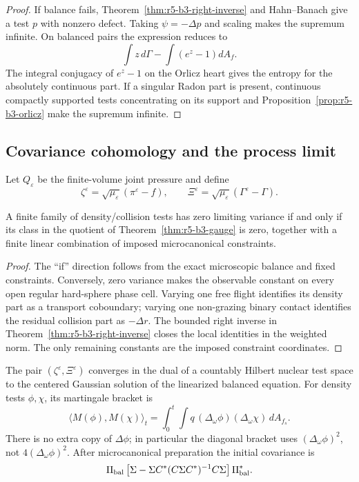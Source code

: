 \begin{proof}
If balance fails, Theorem~\ref{thm:r5-b3-right-inverse} and Hahn--Banach give
a test \(p\) with nonzero defect.  Taking \(\psi=-\Delta p\) and scaling
makes the supremum infinite.  On balanced pairs the expression reduces to
\[
 \int z\,d\Gamma-\int(e^z-1)dA_f.
\]
The integral conjugacy of \(e^z-1\) on the Orlicz heart gives the entropy for
the absolutely continuous part.  If a singular Radon part is present,
continuous compactly supported tests concentrating on its support and
Proposition~\ref{prop:r5-b3-orlicz} make the supremum infinite.
\end{proof}

\subsection{Covariance cohomology and the process limit}

Let \(Q_\varepsilon\) be the finite-volume joint pressure and define
\[
 \zeta^\varepsilon
 =\sqrt{\mu_\varepsilon}(\pi^\varepsilon-f),\qquad
 \Xi^\varepsilon
 =\sqrt{\mu_\varepsilon}(\Gamma^\varepsilon-\Gamma).
\]

\begin{lemma}
\label{lem:r5-b3-null}
A finite family of density/collision tests has zero limiting variance if and
only if its class in the quotient of
Theorem~\ref{thm:r5-b3-gauge} is zero, together with a finite linear
combination of imposed microcanonical constraints.
\end{lemma}

\begin{proof}
The ``if'' direction follows from the exact microscopic balance and fixed
constraints.  Conversely, zero variance makes the observable constant on
every open regular hard-sphere phase cell.  Varying one free flight identifies
its density part as a transport coboundary; varying one non-grazing binary
contact identifies the residual collision part as \(-\Delta r\).  The bounded
right inverse in Theorem~\ref{thm:r5-b3-right-inverse} closes the local
identities in the weighted norm.  The only remaining constants are the
imposed constraint coordinates.
\end{proof}

\begin{theorem}
\label{thm:r5-b3-gaussian}
The pair \((\zeta^\varepsilon,\Xi^\varepsilon)\) converges in the dual of a
countably Hilbert nuclear test space to the centered Gaussian solution of the
linearized balanced equation.  For density tests \(\phi,\chi\), its martingale
bracket is
\[
 \langle M(\phi),M(\chi)\rangle_t
 =
 \int_0^t\!\int
 q\,(\Delta_\omega\phi)(\Delta_\omega\chi)\,dA_{f_s}.
\]
There is no extra copy of \(\Delta\phi\); in particular the diagonal bracket
uses \((\Delta_\omega\phi)^2\), not \(4(\Delta_\omega\phi)^2\).
After microcanonical preparation the initial covariance is
\[
 \Pi_{\rm bal}
 \left[
 \Sigma-\Sigma C^*(C\Sigma C^*)^{-1}C\Sigma
 \right]\Pi_{\rm bal}^*.
\]
\end{theorem}

